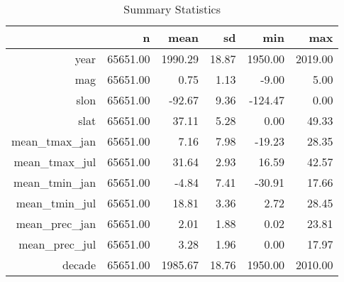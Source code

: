 \begin{table}[ht]
\centering
\caption{Summary Statistics} 
\begin{tabular}{rrrrrr}
  \hline
 & n & mean & sd & min & max \\ 
  \hline
year & 65651.00 & 1990.29 & 18.87 & 1950.00 & 2019.00 \\ 
  mag & 65651.00 & 0.75 & 1.13 & -9.00 & 5.00 \\ 
  slon & 65651.00 & -92.67 & 9.36 & -124.47 & 0.00 \\ 
  slat & 65651.00 & 37.11 & 5.28 & 0.00 & 49.33 \\ 
  mean\_tmax\_jan & 65651.00 & 7.16 & 7.98 & -19.23 & 28.35 \\ 
  mean\_tmax\_jul & 65651.00 & 31.64 & 2.93 & 16.59 & 42.57 \\ 
  mean\_tmin\_jan & 65651.00 & -4.84 & 7.41 & -30.91 & 17.66 \\ 
  mean\_tmin\_jul & 65651.00 & 18.81 & 3.36 & 2.72 & 28.45 \\ 
  mean\_prec\_jan & 65651.00 & 2.01 & 1.88 & 0.02 & 23.81 \\ 
  mean\_prec\_jul & 65651.00 & 3.28 & 1.96 & 0.00 & 17.97 \\ 
  decade & 65651.00 & 1985.67 & 18.76 & 1950.00 & 2010.00 \\ 
   \hline
\end{tabular}
\end{table}
